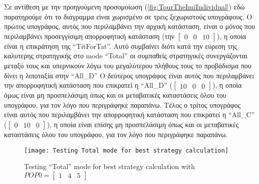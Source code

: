 Σε αντίθεση με την προηγούμενη προσομοίωση (\ref{fig:TourTheImiIndividual}) εδώ παρατηρούμε ότι το διάγραμμα είναι χωρισμένο σε τρεις ξεχωριστούς υπογράφους.
Ο πρώτος υπογράφος, αυτός που περιλαμβάνει την αρχική κατάσταση, είναι ο μόνος που περιλαμβάνει προσεγγίσιμη απορροφητική κατάσταση (την $\begin{bmatrix}0&0&10\end{bmatrix}$), η οποία είναι η επικράτηση της ``TitForTat''. Αυτό συμβαίνει διότι κατά την εύρεση της καλυτερης στρατηγικής στο mode ``Total'' οι συμπαθείς στρατηγικές συνεργάζονται μεταξύ τους και υπερνικούν λόγω του μεγαλύτερου πλήθους τους το προβάδισμα που δίνει η λιποταξία στην ``All\_D''
Ο δεύτερος υπογράφος είναι αυτός που περιλαμβάνει την απορροφητική κατάσταση που επικρατεί η ``All\_D'' ($\begin{bmatrix}10&0&0\end{bmatrix}$), η οποία όμως είναι μη προσπελάσιμη όπως και οι μεταβατικές καταστάσεις όλου του υπογράφου, για τον λόγο που περιγράφηκε παραπάνω.
Τέλος ο τρίτος υπογράφος είναι αυτός που περιλαμβάνει την απορροφητική κατάσταση που επικρατεί η ``All\_C'' ($\begin{bmatrix}0&10&0\end{bmatrix}$), η οποία είναι επίσης μη προσπελάσιμη όπως και οι μεταβατικές καταστάσεις όλου του υπογράφου, για τον λόγο που περιγράφηκε παραπάνω.

	\begin{figure}[h]
	      \centering
	      \texttt{[image: Testing Total mode for best strategy calculation]}
	      \caption{Testing ``Total'' mode for best strategy calculation with $POP0=\begin{bmatrix}1&4&5\end{bmatrix}$}
	      \label{fig:TourTheImiTotal}
	\end{figure}
	

